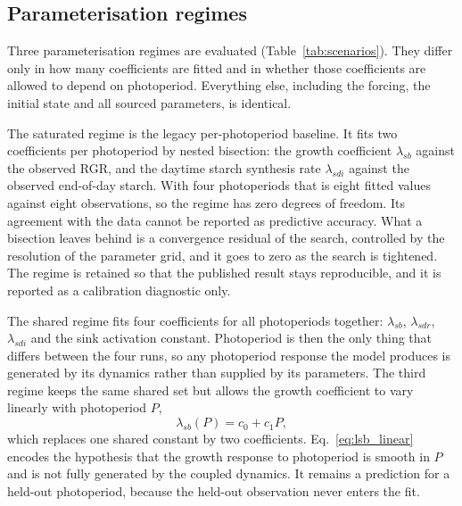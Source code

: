 \subsection{Parameterisation regimes}

Three parameterisation regimes are evaluated (Table~\ref{tab:scenarios}). They
differ only in how many coefficients are fitted and in whether those
coefficients are allowed to depend on photoperiod. Everything else, including
the forcing, the initial state and all sourced parameters, is identical.

The saturated regime is the legacy per-photoperiod baseline. It fits two coefficients per
photoperiod by nested bisection: the growth coefficient $\lambda_{sb}$ against
the observed RGR, and the daytime starch synthesis rate $\lambda_{sdi}$ against
the observed end-of-day starch. With four photoperiods that is eight fitted
values against eight observations, so the regime has zero degrees of freedom.
Its agreement with the data cannot be reported as predictive accuracy. What a
bisection leaves behind is a convergence residual of the search, controlled by
the resolution of the parameter grid, and it goes to zero as the search is
tightened. The regime is retained so that the published result stays
reproducible, and it is reported as a calibration diagnostic only.

The shared regime fits four coefficients for all photoperiods together:
$\lambda_{sb}$, $\lambda_{sdr}$, $\lambda_{sdi}$ and the sink activation
constant. Photoperiod is then the only thing that differs between the four
runs, so any photoperiod response the model produces is generated by its
dynamics rather than supplied by its parameters. The third regime keeps the
same shared set but allows the growth coefficient to vary linearly with
photoperiod $P$,
\begin{equation}
\lambda_{sb}(P) = c_0 + c_1 P ,
\label{eq:lsb_linear}
\end{equation}
which replaces one shared constant by two coefficients. Eq.~\eqref{eq:lsb_linear}
encodes the hypothesis that the growth response to photoperiod is smooth in $P$
and is not fully generated by the coupled dynamics. It remains a prediction for
a held-out photoperiod, because the held-out observation never enters the fit.

